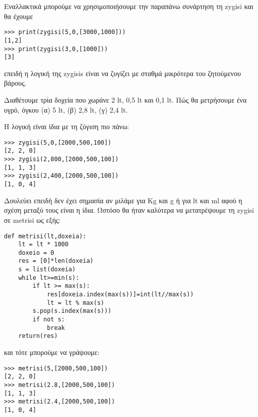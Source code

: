 Εναλλακτικά μπορούμε να χρησιμοποιήσουμε την παραπάνω συνάρτηση τη zygisi και θα έχουμε
\begin{lstlisting}
>>> print(zygisi(5,0,[3000,1000]))
[1,2]
>>> print(zygisi(3,0,[1000]))
[3]
\end{lstlisting}
επειδή η λογική της zygisis είναι να ζυγίζει με σταθμά μικρότερα του ζητούμενου βάρους.
\begin{exercise}
Διαθέτουμε τρία δοχεία που χωράνε 2 lt, 0,5 lt και 0,1 lt. Πώς θα μετρήσουμε ένα υγρό, όγκου (α) 5 lt, (β) 2,8 lt, (γ) 2,4 lt. 
\end{exercise}
Η λογική είναι ίδια με τη ζύγιση πιο πάνω:
\begin{lstlisting}
>>> zygisi(5,0,[2000,500,100])
[2, 2, 0]
>>> zygisi(2,800,[2000,500,100])
[1, 1, 3]
>>> zygisi(2,400,[2000,500,100])
[1, 0, 4]
\end{lstlisting}
Δουλεύει επειδή δεν έχει σημασία αν μιλάμε για Kg και g ή για lt και ml αφού η σχέση μεταξύ τους είναι η ίδια.
Ωστόσο θα ήταν καλύτερα να μετατρέψουμε τη zygisi σε metrisi ως εξής:
\begin{lstlisting}
def metrisi(lt,doxeia):
    lt = lt * 1000
    doxeio = 0
    res = [0]*len(doxeia)
    s = list(doxeia)
    while lt>=min(s):
        if lt >= max(s):
            res[doxeia.index(max(s))]=int(lt//max(s))
            lt = lt % max(s)
        s.pop(s.index(max(s)))
        if not s:
            break
    return(res)
\end{lstlisting}
και τότε μπορούμε να γράψουμε:
\begin{lstlisting}
>>> metrisi(5,[2000,500,100])
[2, 2, 0]
>>> metrisi(2.8,[2000,500,100])
[1, 1, 3]
>>> metrisi(2.4,[2000,500,100])
[1, 0, 4]
\end{lstlisting}
